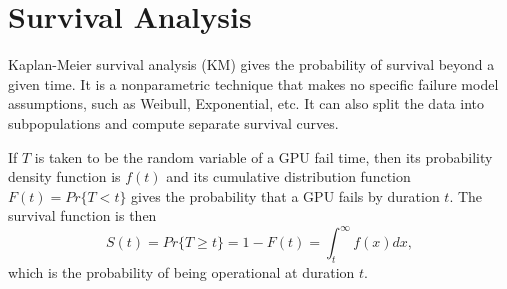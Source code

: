 \section{Survival Analysis}
\label{sec:survival}
 Kaplan-Meier survival analysis (KM) gives the probability of survival
beyond a given time. It is a nonparametric technique that makes no
specific failure model assumptions, such as Weibull, Exponential,
etc. It can also split the data into subpopulations and compute
separate survival curves. 

If $T$ is taken to be the random variable of a GPU fail time, then its
probability density function is $f(t)$ and its cumulative distribution
function $F(t) = Pr\{T < t\}$ gives the probability that a GPU fails
by duration $t$. The survival function is then 
\begin{displaymath}
  S(t) = Pr\{T \geq t\} = 1 - F(t) = \int_t^\infty f(x)dx,
\end{displaymath}
which is the probability of being operational at duration
$t$.

